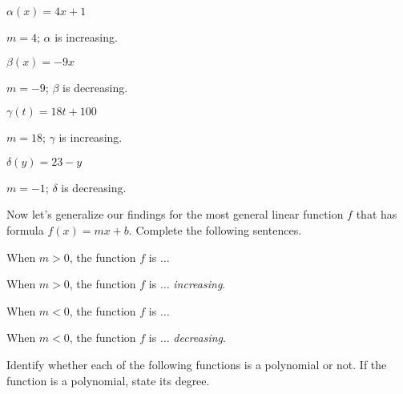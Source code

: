 \begin{exercises}
\begin{problem}
	 \begin{multicols}{4}
		 \begin{subproblem}
			 $\alpha(x)=4x+1$
			 \begin{shortsolution}
				 $m=4$; $\alpha$ is increasing.
			 \end{shortsolution}
		 \end{subproblem}
		 \begin{subproblem}
			 $\beta(x)=-9x$
			 \begin{shortsolution}
				 $m=-9$; $\beta$ is decreasing.
			 \end{shortsolution}
		 \end{subproblem}
		 \begin{subproblem}
			 $\gamma(t)=18t+100$
			 \begin{shortsolution}
				 $m=18$; $\gamma$ is increasing.
			 \end{shortsolution}
		 \end{subproblem}
		 \begin{subproblem}
			 $\delta(y)=23-y$
			 \begin{shortsolution}
				 $m=-1$; $\delta$ is decreasing.
			 \end{shortsolution}
		 \end{subproblem}
	 \end{multicols}
	 Now let's generalize our findings for the most general linear function $f$
	 that has formula $f(x)=mx+b$. Complete the following sentences.
	 \begin{subproblem}
		 When $m>0$, the function $f$ is $\ldots$
		 \begin{shortsolution}
			 When $m>0$, the function $f$ is $\ldots$  \emph{increasing}.
		 \end{shortsolution}
	 \end{subproblem}
	 \begin{subproblem}
		 When $m<0$, the function $f$ is $\ldots$
		 \begin{shortsolution}
			 When $m<0$, the function $f$ is $\ldots$  \emph{decreasing}.
		 \end{shortsolution}
	 \end{subproblem}
	 \end{problem}
	 \begin{problem}
	 Identify whether each of the following functions is a polynomial or not.
	 If the function is a polynomial, state its degree.

\end{problem}
\end{exercises}
